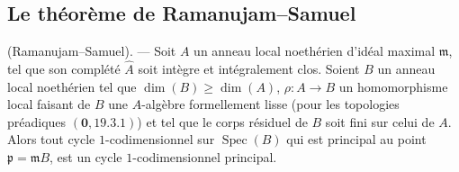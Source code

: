 \subsection{Le théorème de Ramanujam--Samuel}
\label{subsection:IV.21.14}
\label{IV.21.14}

\begin{theorem}[21.14.1]
\label{IV.21.14.1}
\textup{(Ramanujam--Samuel)}. ---
Soit $A$ un anneau local noethérien d'idéal maximal $\mathfrak m$, tel que son complété
$\widehat A$ soit intègre et intégralement clos. Soient $B$ un anneau local noethérien
tel que $\dim(B)\geq\dim(A)$, $\rho:A\to B$ un homomorphisme local faisant de $B$
une $A$-algèbre formellement lisse (pour les topologies préadiques
$(\mathbf 0, 19.3.1)$) et tel que le corps résiduel de $B$ soit fini sur celui de $A$.
Alors tout cycle $1$-codimensionnel sur $\operatorname{Spec}(B)$ qui est principal au
point $\mathfrak p=\mathfrak mB$, est un cycle $1$-codimensionnel principal.
\end{theorem}

